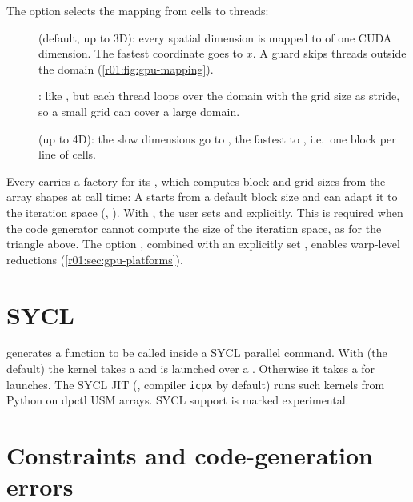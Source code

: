 The  option selects the mapping from cells to threads:
\begin{description}
  \item[] (default, up to 3D): every spatial dimension is mapped to
         of one CUDA dimension. The fastest
        coordinate goes to $x$. A guard  skips threads outside the domain
        (\cref{r01:fig:gpu-mapping}).
  \item[]: like , but each thread loops over the
        domain with the grid size as stride, so a small grid can cover a large domain.
  \item[] (up to 4D): the slow dimensions go to , the
        fastest to , i.e.\ one block per line of cells.
\end{description}
Every  carries a factory for its , which
computes block and grid sizes from the array shapes at call time:
A  starts from a default block size and can
adapt it to the iteration space (, ). With
, the user sets  and
 explicitly. This is required when the code generator cannot compute
the size of the iteration space, as for the triangle above.
The option , combined with an explicitly set
, enables warp-level reductions (\cref{r01:sec:gpu-platforms}).

\section{SYCL}
 generates a function to be called inside a SYCL parallel
command. With  (the default) the kernel takes a
 and is launched over a . Otherwise it takes a
 for  launches. The SYCL JIT (,
compiler \texttt{icpx} by default) runs such kernels from Python on dpctl USM arrays.
SYCL support is marked experimental.

\section{Constraints and code-generation errors}\label{r01:sec:constraints}

